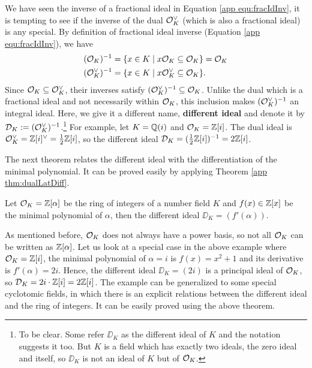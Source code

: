 \documentclass[../main.tex]{subfiles}
\begin{document}
We have seen the inverse of a fractional ideal in Equation \ref{app equ:fracIdInv}, it is tempting to see if the inverse of the dual $\mathcal{O}_K^{\vee}$ (which is also a fractional ideal) is any special. By definition of fractional ideal inverse (Equation \ref{app equ:fracIdInv}), we have 
\begin{align*}
    (\mathcal{O}_K)^{-1} &= \{x \in K \mid x \mathcal{O}_K \subseteq \mathcal{O}_K \} = \mathcal{O}_K \\
    (\mathcal{O}_K^{\vee})^{-1} &= \{x \in K \mid x \mathcal{O}_K^{\vee} \subseteq \mathcal{O}_K \}.
\end{align*}
Since $\mathcal{O}_K \subseteq \mathcal{O}_K^{\vee}$, their inverses satisfy $(\mathcal{O}_K^{\vee})^{-1} \subseteq \mathcal{O}_K$. Unlike the dual which is a fractional ideal and not necessarily within $\mathcal{O}_K$, this inclusion makes $(\mathcal{O}_K^{\vee})^{-1}$ an integral ideal. Here, we give it a different name, \textbf{different ideal}
\reversemarginpar
{}
and denote it by $\mathcal{D}_K := (\mathcal{O}_K^{\vee})^{-1}$.\footnote{To be clear. Some refer $\DD_K$ as the different ideal of $K$ and the notation suggests it too. But $K$ is a field which has exactly two ideals, the zero ideal and itself, so $\DD_K$ is not an ideal of $K$ but of $\mathcal{O}_K$.} For example, let $K=\mathbb{Q}(i)$ and $\mathcal{O}_K=\mathbb{Z}[i]$. The dual ideal is $\mathcal{O}_K^{\vee}=\mathbb{Z}[i]^{\vee}=\frac{1}{2}\mathbb{Z}[i]$, so the different ideal $\mathcal{D}_K=(\frac{1}{2}\mathbb{Z}[i])^{-1}=2\mathbb{Z}[i]$.

The next theorem relates the different ideal with the differentiation of the minimal polynomial. It can be proved easily by applying Theorem \ref{app thm:dualLatDiff}.
\begin{theorem}\label{app thm:difIdeal1}
Let $\mathcal{O}_K=\mathbb{Z}[\alpha]$ be the ring of integers of a number field $K$ and $f(x) \in \mathbb{Z}[x]$ be the minimal polynomial of $\alpha$, then the different ideal $\DD_K=(f'(\alpha))$.
\end{theorem}

As mentioned before, $\mathcal{O}_K$ does not always have a power basis, so not all $\mathcal{O}_K$ can be written as $\mathbb{Z}[\alpha]$. 
Let us look at a special case in the above example where $\mathcal{O}_K=\mathbb{Z}[i]$, the minimal polynomial of $\alpha=i$ is $f(x)=x^2+1$ and its derivative is $f'(\alpha)=2i$. Hence, the different ideal $\DD_K=(2i)$ is a principal ideal of $\mathcal{O}_K$, so $\mathcal{D}_K=2i\cdot \mathbb{Z}[i]=2\mathbb{Z}[i]$. The example can be generalized to some special cyclotomic fields, in which there is an explicit relations between the different ideal and the ring of integers. It can be easily proved using the above theorem. 
\end{document}
